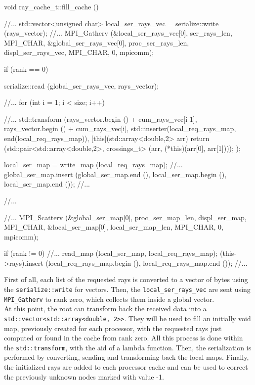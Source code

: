 \documentclass[11pt,a4paper]{article}
\begin{document}
\begin{code}
void 
ray_cache_t::fill_cache ()
{
  //...
  std::vector<unsigned char> local_ser_rays_vec = serialize::write (rays_vector);
  //...
  MPI_Gatherv (&local_ser_rays_vec[0], ser_rays_len, MPI_CHAR, &global_ser_rays_vec[0],
               proc_ser_rays_len, displ_ser_rays_vec, MPI_CHAR, 0, mpicomm);
  
  if (rank == 0)
  {
    serialize::read (global_ser_rays_vec, rays_vector);
    
    //...
    for (int i = 1; i < size; i++)
      { 
        //...
        std::transform (rays_vector.begin () + cum_rays_vec[i-1], 
                        rays_vector.begin () + cum_rays_vec[i],
                        std::inserter(local_req_rays_map, end(local_req_rays_map)),
                        [this](std::array<double,2> arr) 
                        { return (std::pair<std::array<double,2>, crossings_t>
                        (arr, (*this)(arr[0], arr[1]))); }); 
              
        local_ser_map = write_map (local_req_rays_map);
        //...
        global_ser_map.insert (global_ser_map.end (), local_ser_map.begin (), 
                               local_ser_map.end ());
        //...
      }
    //...
  }
    
  //...
  MPI_Scatterv (&global_ser_map[0], proc_ser_map_len, displ_ser_map, MPI_CHAR, 
                &local_ser_map[0], local_ser_map_len, MPI_CHAR, 0, mpicomm);
  
  if (rank != 0)
    {
      //...
      read_map (local_ser_map, local_req_rays_map);
      (this->rays).insert (local_req_rays_map.begin (), local_req_rays_map.end ());
    }
  //...
}
\end{code}
First of all, each list of the requested rays is converted to a vector of bytes using the \texttt{serialize::write} for vectors. Then, the \texttt{local\_ser\_rays\_vec} are sent using \texttt{MPI\_Gatherv} to rank zero, which collects them inside a global vector. \\
At this point, the root can transform back the received data into a \texttt{std::vector<std::array<double, 2>>}. They will be used to fill an initially void map, previously created for each processor, with the requested rays just computed or found in the cache from rank zero. All this process is done within the \texttt{std::transform}, with the aid of a lambda function. 
Then, the serialization is performed by converting, sending and transforming back the local maps. Finally, the initialized rays are added to each processor cache and can be used to correct the previously unknown nodes marked with value -1. 
\end{document}
